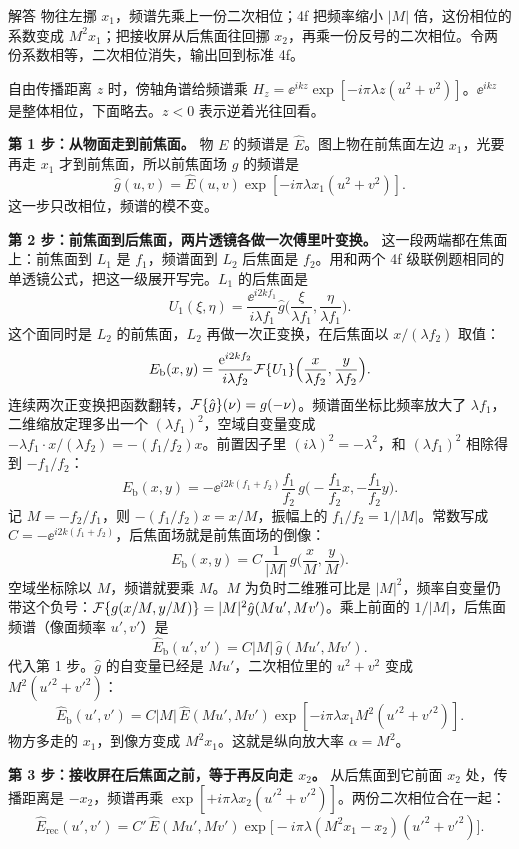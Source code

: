 \begin{exam}{解答}
物往左挪 $x_1$，频谱先乘上一份二次相位；4f 把频率缩小 $|M|$ 倍，这份相位的系数变成 $M^2x_1$；把接收屏从后焦面往回挪 $x_2$，再乘一份反号的二次相位。令两份系数相等，二次相位消失，输出回到标准 4f。

自由传播距离 $z$ 时，傍轴角谱给频谱乘 $H_z=\ee^{ikz}\exp[-i\pi\lambda z(u^2+v^2)]$。$\ee^{ikz}$ 是整体相位，下面略去。$z<0$ 表示逆着光往回看。

\textbf{第 1 步：从物面走到前焦面。}
物 $E$ 的频谱是 $\hat E$。图上物在前焦面左边 $x_1$，光要再走 $x_1$ 才到前焦面，所以前焦面场 $g$ 的频谱是
\[
\hat g(u,v)=\hat E(u,v)\exp[-i\pi\lambda x_1(u^2+v^2)] .
\]
这一步只改相位，频谱的模不变。

\textbf{第 2 步：前焦面到后焦面，两片透镜各做一次傅里叶变换。}
这一段两端都在焦面上：前焦面到 $L_1$ 是 $f_1$，频谱面到 $L_2$ 后焦面是 $f_2$。用和两个 4f 级联例题相同的单透镜公式，把这一级展开写完。$L_1$ 的后焦面是
\[
U_1(\xi,\eta)=\frac{\ee^{i2kf_1}}{i\lambda f_1}\hat g\Big(\frac{\xi}{\lambda f_1},\frac{\eta}{\lambda f_1}\Big).
\]
这个面同时是 $L_2$ 的前焦面，$L_2$ 再做一次正变换，在后焦面以 $x/(\lambda f_2)$ 取值：
\[
E_{\text{b}}(x,y)=\frac{\mathrm{e}^{i2kf_2}}{i\lambda f_2}\mathcal{F}\{U_1\}\Big(\frac{x}{\lambda f_2},\frac{y}{\lambda f_2}\Big).
\]
连续两次正变换把函数翻转，$\mathcal{F}\{\hat g\}(\nu)=g(-\nu)$。频谱面坐标比频率放大了 $\lambda f_1$，二维缩放定理多出一个 $(\lambda f_1)^2$，空域自变量变成 $-\lambda f_1\cdot x/(\lambda f_2)=-(f_1/f_2)x$。前置因子里 $(i\lambda)^2=-\lambda^2$，和 $(\lambda f_1)^2$ 相除得到 $-f_1/f_2$：
\[
E_{\text{b}}(x,y)=-\ee^{i2k(f_1+f_2)}\frac{f_1}{f_2}\,g\Big(-\frac{f_1}{f_2}x,-\frac{f_1}{f_2}y\Big).
\]
记 $M=-f_2/f_1$，则 $-(f_1/f_2)x=x/M$，振幅上的 $f_1/f_2=1/|M|$。常数写成 $C=-\ee^{i2k(f_1+f_2)}$，后焦面场就是前焦面场的倒像：
\[
E_{\text{b}}(x,y)=C\,\frac{1}{|M|}\,g\Big(\frac xM,\frac yM\Big).
\]
空域坐标除以 $M$，频谱就要乘 $M$。$M$ 为负时二维雅可比是 $|M|^2$，频率自变量仍带这个负号：$\mathcal{F}\{g(x/M,y/M)\}=|M|^2\hat g(Mu',Mv')$。乘上前面的 $1/|M|$，后焦面频谱（像面频率 $u',v'$）是
\[
\hat E_{\text{b}}(u',v')=C|M|\,\hat g(Mu',Mv').
\]
代入第 1 步。$\hat g$ 的自变量已经是 $Mu'$，二次相位里的 $u^2+v^2$ 变成 $M^2(u'^2+v'^2)$：
\[
\hat E_{\text{b}}(u',v')=C|M|\,\hat E(Mu',Mv')\exp[-i\pi\lambda x_1 M^2(u'^2+v'^2)] .
\]
物方多走的 $x_1$，到像方变成 $M^2x_1$。这就是纵向放大率 $\alpha=M^2$。

\textbf{第 3 步：接收屏在后焦面之前，等于再反向走 $x_2$。}
从后焦面到它前面 $x_2$ 处，传播距离是 $-x_2$，频谱再乘 $\exp[+i\pi\lambda x_2(u'^2+v'^2)]$。两份二次相位合在一起：
\[
\hat E_{\text{rec}}(u',v')=C'\,\hat E(Mu',Mv')\exp\!\big[-i\pi\lambda(M^2x_1-x_2)(u'^2+v'^2)\big].
\]


\end{exam}
